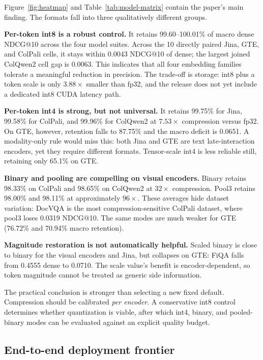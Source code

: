 \documentclass{article}
\makeatletter
\newcommand{\ndcg}{NDCG@10}
\makeatother
\begin{document}
Figure~\ref{fig:heatmap} and Table~\ref{tab:model-matrix} contain the paper's
main finding. The formats fall into three qualitatively different groups.

\textbf{Per-token int8 is a robust control.} It retains 99.60--100.01\% of
macro dense \ndcg{} across the four model suites. Across the 10 directly
paired Jina, GTE, and ColPali cells, it stays within 0.0043 \ndcg{} of dense;
the largest joined ColQwen2 cell gap is 0.0063. This indicates that all four
embedding families tolerate a meaningful reduction in precision. The
trade-off is storage: int8 plus a token scale is only $3.88\times$ smaller
than fp32, and the release does not yet include a dedicated int8 CUDA latency
path.

\textbf{Per-token int4 is strong, but not universal.} It retains 99.75\% for
Jina, 99.58\% for ColPali, and 99.96\% for ColQwen2 at $7.53\times$
compression versus fp32. On GTE, however, retention falls to 87.75\% and the
macro deficit is 0.0651. A modality-only rule would miss this: both Jina and
GTE are text late-interaction encoders, yet they require different formats.
Tensor-scale int4 is less reliable still, retaining only 65.1\% on GTE.

\textbf{Binary and pooling are compelling on visual encoders.} Binary retains
98.33\% on ColPali and 98.65\% on ColQwen2 at $32\times$ compression. Pool3
retains 98.00\% and 98.11\% at approximately $96\times$. These averages hide
dataset variation: DocVQA is the most compression-sensitive ColPali dataset,
where pool3 loses 0.0319 \ndcg{}. The same modes are much weaker for GTE
(76.72\% and 70.94\% macro retention).

\textbf{Magnitude restoration is not automatically helpful.} Scaled binary
is close to binary for the visual encoders and Jina, but collapses on GTE:
FiQA falls from 0.4555 dense to 0.0710. The scale value's benefit is
encoder-dependent, so token magnitude cannot be treated as generic side
information.

The practical conclusion is stronger than selecting a new fixed default.
Compression should be calibrated \emph{per encoder}. A conservative int8
control determines whether quantization is viable, after which int4, binary,
and pooled-binary modes can be evaluated against an explicit quality budget.

\subsection{End-to-end deployment frontier}
\label{sec:production}
\end{document}
